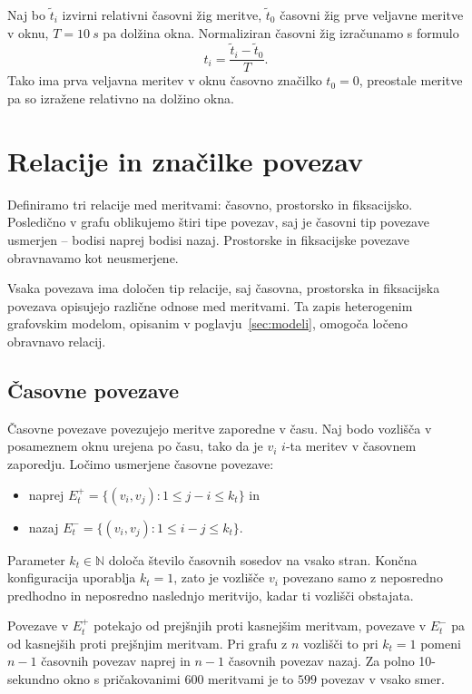 Naj bo $\tilde{t}_i$ izvirni relativni časovni žig meritve, $\tilde{t}_0$ časovni žig prve veljavne meritve v oknu, $T=10~s$ pa dolžina okna.
Normaliziran časovni žig izračunamo s formulo
\begin{equation}
    t_i = \frac{\tilde{t}_i - \tilde{t}_0}{T}.
\end{equation}
Tako ima prva veljavna meritev v oknu časovno značilko $t_0=0$, preostale meritve pa so izražene relativno na dolžino okna.

\section{Relacije in značilke povezav}
Definiramo tri relacije med meritvami: časovno, prostorsko in fiksacijsko.
Posledično v grafu oblikujemo štiri tipe povezav, saj je časovni tip povezave usmerjen -- bodisi naprej bodisi nazaj.
Prostorske in fiksacijske povezave obravnavamo kot neusmerjene.

Vsaka povezava ima določen tip relacije, saj časovna, prostorska in fiksacijska povezava opisujejo različne odnose med meritvami.
Ta zapis heterogenim grafovskim modelom, opisanim v poglavju~\ref{sec:modeli}, omogoča ločeno obravnavo relacij.

\subsection{Časovne povezave}
Časovne povezave povezujejo meritve zaporedne v času.
Naj bodo vozlišča v posameznem oknu urejena po času, tako da je $v_i$ $i$-ta meritev v časovnem zaporedju.
Ločimo usmerjene časovne povezave:
\begin{itemize}
    \item naprej $E_t^+ = \{(v_i, v_j) : 1 \leq j - i \leq k_t\}$ in
    \item nazaj $E_t^- = \{(v_i, v_j) : 1 \leq i - j \leq k_t\}$.
\end{itemize}
Parameter $k_t \in \mathbb{N}$ določa število časovnih sosedov na vsako stran.
Končna konfiguracija uporablja $k_t=1$, zato je vozlišče $v_i$ povezano samo z neposredno predhodno in neposredno naslednjo meritvijo, kadar ti vozlišči obstajata.

Povezave v $E_t^+$ potekajo od prejšnjih proti kasnejšim meritvam, povezave v $E_t^-$ pa od kasnejših proti prejšnjim meritvam.
Pri grafu z $n$ vozlišči to pri $k_t=1$ pomeni $n-1$ časovnih povezav naprej in $n-1$ časovnih povezav nazaj.
Za polno 10-sekundno okno s pričakovanimi $600$ meritvami je to $599$ povezav v vsako smer.


